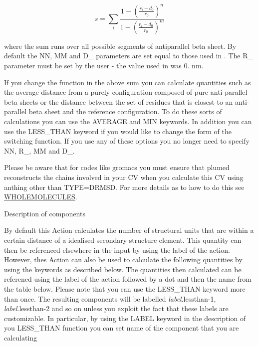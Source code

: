 \[ s = \sum_i \frac{ 1 - \left(\frac{r_i-d_0}{r_0}\right)^n } { 1 - \left(\frac{r_i-d_0}{r_0}\right)^m } \]

where the sum runs over all possible segments of antiparallel beta sheet. By default the N\+N, M\+M and D\+\_ parameters are set equal to those used in \cite{pietrucci09jctc}. The R\+\_ parameter must be set by the user -\/ the value used in \cite{pietrucci09jctc} was 0. nm.

If you change the function in the above sum you can calculate quantities such as the average distance from a purely configuration composed of pure anti-\/parallel beta sheets or the distance between the set of residues that is closest to an anti-\/parallel beta sheet and the reference configuration. To do these sorts of calculations you can use the A\+V\+E\+R\+A\+G\+E and M\+I\+N keywords. In addition you can use the L\+E\+S\+S\+\_\+\+T\+H\+A\+N keyword if you would like to change the form of the switching function. If you use any of these options you no longer need to specify N\+N, R\+\_, M\+M and D\+\_.

Please be aware that for codes like gromacs you must ensure that plumed reconstructs the chains involved in your C\+V when you calculate this C\+V using anthing other than T\+Y\+P\+E=D\+R\+M\+S\+D. For more details as to how to do this see \hyperlink{WHOLEMOLECULES}{W\+H\+O\+L\+E\+M\+O\+L\+E\+C\+U\+L\+E\+S}.

\begin{DoxyParagraph}{Description of components}

\end{DoxyParagraph}
By default this Action calculates the number of structural units that are within a certain distance of a idealised secondary structure element. This quantity can then be referenced elsewhere in the input by using the label of the action. However, thes Action can also be used to calculate the following quantities by using the keywords as described below. The quantities then calculated can be referened using the label of the action followed by a dot and then the name from the table below. Please note that you can use the L\+E\+S\+S\+\_\+\+T\+H\+A\+N keyword more than once. The resulting components will be labelled {\itshape label}.lessthan-\/1, {\itshape label}.lessthan-\/2 and so on unless you exploit the fact that these labels are customizable. In particular, by using the L\+A\+B\+E\+L keyword in the description of you L\+E\+S\+S\+\_\+\+T\+H\+A\+N function you can set name of the component that you are calculating

